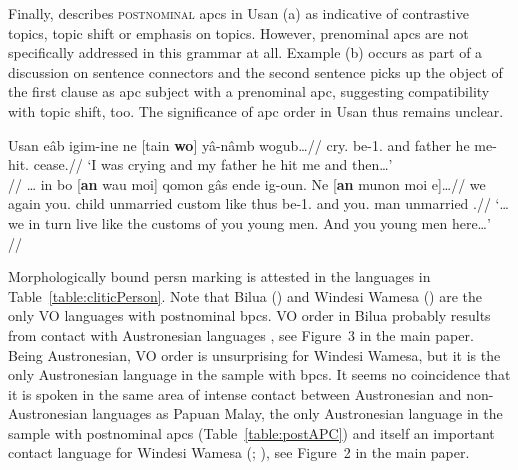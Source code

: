 \documentclass[A4paper]{article}
\newcommand{\ant}{\glossformat{ant}}	%
\newcommand{\merg}{\glossformat{merg}}	%
\newcommand{\anaph}{\glossformat{anaph}}	%
\newcommand{\inch}{\glossformat{inch}}	%
\newcommand{\rep}{\glossformat{rep}}	%
\begin{document}
Finally, \citet[53f., 167]{reesink1987} describes \textsc{postnominal} \glspl{apc} in Usan (\nextx a) as indicative of contrastive topics, topic shift or emphasis on topics. However, prenominal \glspl{apc} are not specifically addressed in this grammar at all. Example (\nextx b) occurs as part of a discussion on sentence connectors and the second sentence picks up the object of the first clause as \gls{apc} subject with a prenominal \gls{apc}, suggesting compatibility with topic shift, too. The significance of \gls{apc} order in Usan thus remains unclear.  %

\pex Usan
\a \begingl
\gla eâb igim-ine ne [tain \textbf{wo}] yâ-nâmb wogub\ldots//
\glb cry.\Ss{} be-1\Sg.\Ds{} and \phantom{[}father he me-hit.\Ss{} cease.\Ss{}//
\glft `I was crying and my father he hit me and then\ldots' \\
\citep[after][167, (99)]{reesink1987}//
\endgl
\a 
\begingl
\gla \ldots{} in bo [\textbf{an} wau moi] qomon gâs ende ig-oun. Ne [\textbf{an} munon moi e]\ldots//
\glb {} we again \phantom{[}you.\Pl{} child unmarried custom like thus be-1\Pl.\Prs{} and \phantom{[}you.\Pl{} man unmarried \Dem.\Prox{}//
\glft `\ldots we in turn live like the customs of you young men. And you young men here\ldots'\\
\citep[initial part of][190f., (41)]{reesink1987}\label{ex:usanppdc}//
\endgl
\xe 



Morphologically bound \gls{persn} marking is attested in the languages in Table~\ref{table:cliticPerson}. 
Note that Bilua (\nextx) %
and Windesi Wamesa (\anextx) are the only VO languages with postnominal \glspl{bpc}. VO order in Bilua probably results from contact with Austronesian languages \citep[323]{terrill2011solomoncontact}, see Figure~3 in the main paper. Being Austronesian, VO order is unsurprising for Windesi Wamesa, but it is the only Austronesian language in the sample with \glspl{bpc}. It seems no coincidence that it is spoken in the same area of intense contact between Austronesian and non-Austronesian languages as Papuan Malay, the only Austronesian language in the sample with postnominal \glspl{apc} (Table~\ref{table:postAPC}) and itself an important contact language for Windesi Wamesa (\citealp[68f.]{gasser2014}; \citealp[27--33]{kluge2017}), see Figure~2 in the main paper.
\end{document}
